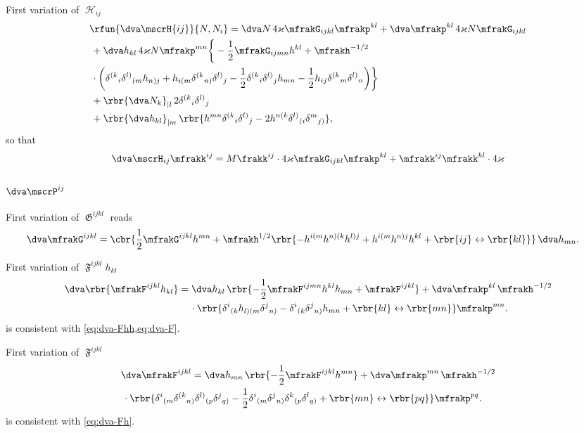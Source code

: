\documentclass[a4paper,11pt]{article}
\begin{document}
First variation of $\mscrH_{ij}$
\begin{align}
&\rfun{\dva\mscrH{ij}}{N, N_i} = \dva N\,4\varkappa\mfrakG_{ijkl}\mfrakp^{kl}
+ \dva\mfrakp^{kl}\,4\varkappa N \mfrakG_{ijkl}
\nonumber \\
&\,+
\dva h_{kl}\,4\varkappa N \mfrakp^{mn}
\bigg\{-\frac{1}{2}\mfrakG_{ijmn}h^{kl} 
+ \mfrakh^{-1/2}
\nonumber \\
&\,\cdot\bigg(
\delta^{(k}{}_{i} \delta^{l)}{}_{(m} h_{n)j} +
h_{i(m} \delta^{(k}{}_{n)} \delta^{l)}{}_{j} - \frac{1}{2}
\delta^{(k}{}_{i} \delta^{l)}{}_{j} h_{mn} - \frac{1}{2}
h_{ij} \delta^{(k}{}_{m} \delta^{l)}{}_{n} \bigg)\bigg\}
\nonumber \\
&\,+
\rbr{\dva N_k}_{|l}\, 2 \delta^{(k}{}_{i}\delta^{l)}{}_{j}
\nonumber \\
&\,+
\rbr{\dva h_{kl}}_{|m}\, \rbr{
h^{mn} \delta^{(k}{}_{i} \delta^{l)}{}_{j} - 2
h^{n(k} \delta^{l)}{}_{(i} \delta^{m}{}_{j)}},
\end{align}
so that
\begin{align}
&\quad\dva \mscrH_{ij} \mfrakk^{ij} =
M \frakk^{ij}\cdot 4\varkappa \mfrakG_{ijkl} \mfrakp^{kl} +
\mfrakk^{ij} \mfrakk^{kl}\cdot 4\varkappa
\end{align}


\subsubsection{$\dva\mscrP^{ij}$}


First variation of $\mfrakG^{ijkl}$ reads
\begin{align}
\dva \mfrakG^{ijkl} &= \cbr{\frac{1}{2}\mfrakG^{ijkl}h^{mn}
+ \mfrakh^{1/2}\rbr{-h^{i(m}h^{n)(k}h^{l)j} + h^{i(m}h^{n)j}h^{kl} +
\rbr{ij} \leftrightarrow \rbr{kl}} } \,\dva h_{mn}.
\end{align}

First variation of $\mfrakF^{ijkl}h_{kl}$
\begin{align}
\dva\rbr{\mfrakF^{ijkl}h_{kl}} &= \dva h_{kl}\,
\rbr{-\frac{1}{2}\mfrakF^{ijmn}h^{kl}h_{mn}+\mfrakF^{ijkl}}
+
\dva \mfrakp^{kl} \, \mfrakh^{-1/2}
\nonumber \\
&\quad\,\cdot
\rbr{\delta^{i}{}_{(k}h_{l)(m}\delta^{j}{}_{n)}-
\delta^{i}{}_{(k}\delta^{j}{}_{n)}h_{mn} 
+ \rbr{kl}\leftrightarrow\rbr{mn}}
\mfrakp^{mn}.
\label{eq:dva-Fh}
\end{align}
 is consistent with \cref{eq:dva-Fhh,eq:dva-F}.

First variation of $\mfrakF^{ijkl}$
\begin{align}
&\dva\mfrakF^{ijkl} = \dva h_{mn}\,\rbr{-\frac{1}{2}\mfrakF^{ijkl}h^{mn}}
+\dva\mfrakp^{mn}\,\mfrakh^{-1/2}
\nonumber \\
&\,\cdot \rbr{
\delta^{i}{}_{(m} \delta^{(k}{}_{n)} \delta^{l)}{}_{(p} \delta^{j}{}_{q)} -
\frac{1}{2}
\delta^{i}{}_{(m} \delta^{j}{}_{n)} \delta^{k}{}_{(p} \delta^{l}{}_{q)}
+\rbr{mn}\leftrightarrow\rbr{pq}}\mfrakp^{pq}.
\label{eq:dva-F}
\end{align}
 is consistent with \cref{eq:dva-Fh}.
\end{document}
